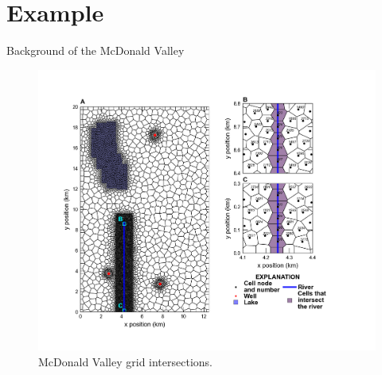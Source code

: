 \documentclass[11pt, oneside]{article}   	%
\begin{document}
\section{Example}

Background of the McDonald Valley

\begin{figure}[ht!]
	\begin{center}
		\includegraphics{figures/mv_voronoi_river_discretization.png}
	\end{center}
	\caption{McDonald Valley grid intersections.}
	\label{fig:mvgrid}
\end{figure}
\end{document}
